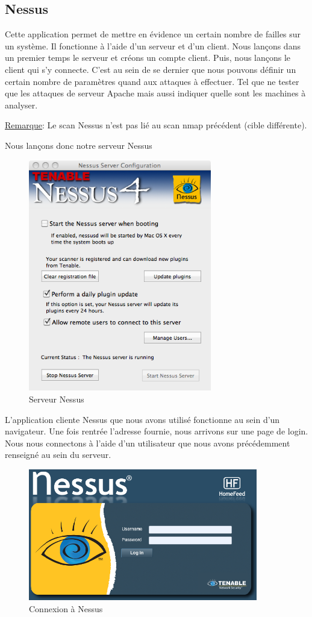 \documentclass[a4paper,12pt]{article}
\begin{document}
\subsection{Nessus}
Cette application permet de mettre en évidence un certain nombre de failles sur un système. Il fonctionne à l'aide d'un serveur et d'un client.
Nous lançons dans un premier temps le serveur et créons un compte client. Puis, nous lançons le client qui s'y connecte. C'est au sein de se dernier 
que nous pouvons définir un certain nombre de paramètres quand aux \og attaques \fg{} à effectuer. Tel que ne tester que les attaques de serveur Apache
mais aussi indiquer quelle sont les machines à analyser.

\underline{Remarque}: Le scan Nessus n'est pas lié au scan nmap précédent (cible différente). 

Nous lançons donc notre serveur Nessus
\begin{figure}[H]
	\center
	\includegraphics[width=8cm]{img/nessus_serveur.png}
	\caption{Serveur Nessus}
\end{figure}


L'application cliente Nessus que nous avons utilisé fonctionne au sein d'un navigateur. Une fois rentrée l'adresse fournie, nous arrivons sur une page 
de login. Nous nous connectons à l'aide d'un utilisateur que nous avons précédemment renseigné au sein du serveur.

\begin{figure}[H]
	\center
	\includegraphics[width=10cm]{img/nessus_client_login.png}
	\caption{Connexion à Nessus}
\end{figure}
\end{document}
